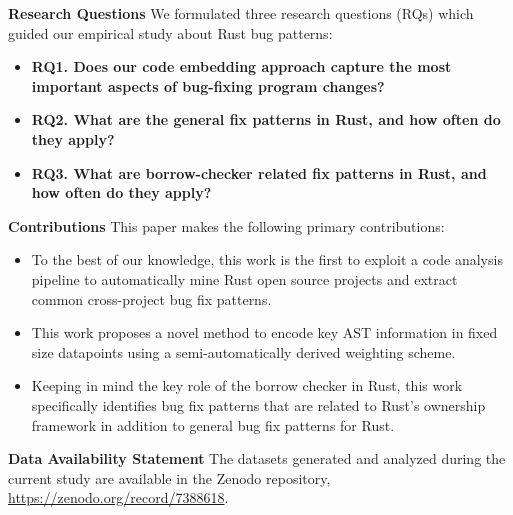 \noindent \textbf{Research Questions} We formulated three research questions (RQs) which guided our empirical study about Rust bug patterns:

\begin{itemize}
    \item \textbf{RQ1. Does our code embedding approach capture the most important aspects of bug-fixing program changes?} 
    \item \textbf{RQ2. What are the general fix patterns in Rust, and how often do they apply?} 
    \item \textbf{RQ3. What are borrow-checker related fix patterns in Rust, and how often do they apply?}
\end{itemize}

\noindent \textbf{Contributions} This paper makes the following primary contributions:

\begin{itemize}
    \item To the best of our knowledge, this work is the first to exploit a code analysis pipeline to automatically mine Rust open source projects and extract common cross-project bug fix patterns.
    \item This work proposes a novel method to encode key AST information in fixed size datapoints using a semi-automatically derived weighting scheme.
    \item Keeping in mind the key role of the borrow checker in Rust, this work specifically identifies bug fix patterns that are related to Rust's ownership framework in addition to general bug fix patterns for Rust.
\end{itemize}

\noindent \textbf{Data Availability Statement} The datasets generated and analyzed during the current study are available in the Zenodo repository, \url{https://zenodo.org/record/7388618}.
